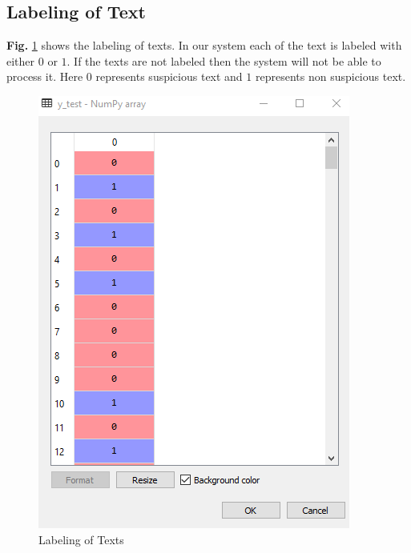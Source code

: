 \documentclass[12pt,a4paper]{report}
\begin{document}
\subsection{Labeling of Text}
\textbf{Fig.} \ref{fig:lbt} shows the labeling of texts.
In our system each of the text is labeled with either $0$ or $1$. If the texts are not labeled then the system will not be able to process it. Here $0$ represents suspicious text and $1$ represents non suspicious text. 
\begin{figure}[h!]
    \centering
    \includegraphics[scale=0.55]{Figures/label_of_text.PNG}
    \caption{Labeling of Texts}
    \label{fig:lbt}
\end{figure}
\end{document}
